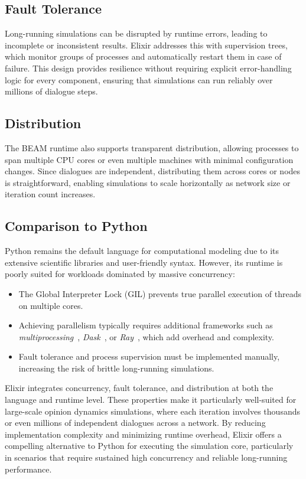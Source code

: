 \documentclass[
]{ceurart}
\begin{document}
\subsection{Fault Tolerance}
Long-running simulations can be disrupted by runtime errors, leading to incomplete or inconsistent results. Elixir addresses this with supervision trees, which monitor groups of processes and automatically restart them in case of failure. This design provides resilience without requiring explicit error-handling logic for every component, ensuring that simulations can run reliably over millions of dialogue steps.

\subsection{Distribution}
The BEAM runtime also supports transparent distribution, allowing processes to span multiple CPU cores or even multiple machines with minimal configuration changes. Since dialogues are independent, distributing them across cores or nodes is straightforward, enabling simulations to scale horizontally as network size or iteration count increases.

\subsection{Comparison to Python}
Python remains the default language for computational modeling due to its extensive scientific libraries and user-friendly syntax. However, its runtime is poorly suited for workloads dominated by massive concurrency:

\begin{itemize}
	\item The Global Interpreter Lock (GIL) prevents true parallel execution of threads on multiple cores.~\cite{PythonThreading}
	\item Achieving parallelism typically requires additional frameworks such as \emph{multiprocessing}~\cite{PythonMultiprocessing}, \emph{Dask}~\cite{PythonDask}, or \emph{Ray}~\cite{PythonRay}, which add overhead and complexity.
	\item Fault tolerance and process supervision must be implemented manually, increasing the risk of brittle long-running simulations.
\end{itemize}

Elixir integrates concurrency, fault tolerance, and distribution at both the language and runtime level. These properties make it particularly well-suited for large-scale opinion dynamics simulations, where each iteration involves thousands or even millions of independent dialogues across a network. By reducing implementation complexity and minimizing runtime overhead, Elixir offers a compelling alternative to Python for executing the simulation core, particularly in scenarios that require sustained high concurrency and reliable long-running performance.
\end{document}
